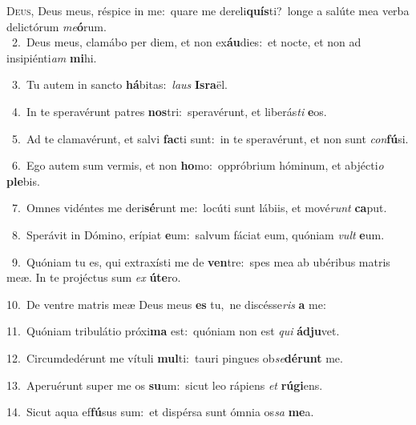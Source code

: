 \lettrine{\initial\textcolor{\initialcolor}{D}}{eus,} Deus meus, réspice in me:~\dagger quare me dereli\-\textbf{quís}\-ti?~\star longe a salúte mea verba delictórum \textit{me}\-\textbf{ó}rum.\\
{\numbfont\textcolor{\numbcolor}{~2.}}~Deus meus, clamábo per diem, et non ex\-\textbf{áu}\-dies:~\star et nocte, et non ad insipiénti\textit{am} \textbf{mi}\-hi.\par
{\numbfont\textcolor{\numbcolor}{~3.}}~Tu autem in sancto \textbf{há}\-bitas:~\star \textit{laus} \textbf{Is}\-\textbf{ra}ël.\par
{\numbfont\textcolor{\numbcolor}{~4.}}~In te speravérunt patres \textbf{nos}\-tri:~\star speravérunt, et liberás\textit{ti} \textbf{e}\-os.\par
{\numbfont\textcolor{\numbcolor}{~5.}}~Ad te clamavérunt, et salvi \textbf{fac}\-ti sunt:~\star in te speravérunt, et non sunt \textit{con}\-\textbf{fú}si.\par
{\numbfont\textcolor{\numbcolor}{~6.}}~Ego autem sum vermis, et non \textbf{ho}\-mo:~\star oppróbrium hóminum, et abjécti\textit{o} \textbf{ple}\-bis.\par
{\numbfont\textcolor{\numbcolor}{~7.}}~Omnes vidéntes me deri\-\textbf{sé}\-runt me:~\star locúti sunt lábiis, et mové\textit{runt} \textbf{ca}\-put.\par
{\numbfont\textcolor{\numbcolor}{~8.}}~Sperávit in Dómino, erípiat \textbf{e}\-um:~\star salvum fáciat eum, quóniam \textit{vult} \textbf{e}\-um.\par
{\numbfont\textcolor{\numbcolor}{~9.}}~Quóniam tu es, qui extraxísti me de \textbf{ven}\-tre:~\star spes mea ab ubéribus matris meæ. In te projéctus sum \textit{ex} \textbf{ú}\-\textbf{te}ro.\par
{\numbfont\textcolor{\numbcolor}{10.}}~De ventre matris meæ Deus meus \textbf{es} tu,~\star ne discésse\textit{ris} \textbf{a} me:\par
{\numbfont\textcolor{\numbcolor}{11.}}~Quóniam tribulátio próxi\textbf{ma} est:~\star quóniam non est \textit{qui} \textbf{ád}\-\textbf{ju}vet.\par
{\numbfont\textcolor{\numbcolor}{12.}}~Circumdedérunt me vítuli \textbf{mul}\-ti:~\star tauri pingues ob\-\textit{se}\-\textbf{dé}\textbf{runt} me.\par
{\numbfont\textcolor{\numbcolor}{13.}}~Aperuérunt super me os \textbf{su}\-um:~\star sicut leo rápiens \textit{et} \textbf{rú}\-\textbf{gi}ens.\par
{\numbfont\textcolor{\numbcolor}{14.}}~Sicut aqua ef\-\textbf{fú}\-sus sum:~\star et dispérsa sunt ómnia os\textit{sa} \textbf{me}\-a.\par
